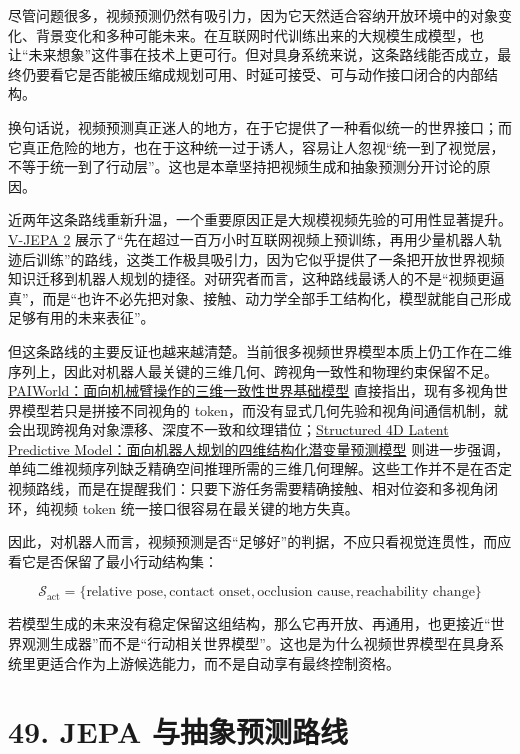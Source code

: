 尽管问题很多，视频预测仍然有吸引力，因为它天然适合容纳开放环境中的对象变化、背景变化和多种可能未来。在互联网时代训练出来的大规模生成模型，也让“未来想象”这件事在技术上更可行。但对具身系统来说，这条路线能否成立，最终仍要看它是否能被压缩成规划可用、时延可接受、可与动作接口闭合的内部结构。

换句话说，视频预测真正迷人的地方，在于它提供了一种看似统一的世界接口；而它真正危险的地方，也在于这种统一过于诱人，容易让人忽视“统一到了视觉层，不等于统一到了行动层”。这也是本章坚持把视频生成和抽象预测分开讨论的原因。

近两年这条路线重新升温，一个重要原因正是大规模视频先验的可用性显著提升。\href{https://arxiv.org/abs/2506.09985}{V-JEPA 2} 展示了“先在超过一百万小时互联网视频上预训练，再用少量机器人轨迹后训练”的路线，这类工作极具吸引力，因为它似乎提供了一条把开放世界视频知识迁移到机器人规划的捷径。对研究者而言，这种路线最诱人的不是“视频更逼真”，而是“也许不必先把对象、接触、动力学全部手工结构化，模型就能自己形成足够有用的未来表征”。

但这条路线的主要反证也越来越清楚。当前很多视频世界模型本质上仍工作在二维序列上，因此对机器人最关键的三维几何、跨视角一致性和物理约束保留不足。\href{https://arxiv.org/abs/2606.18375}{PAIWorld：面向机械臂操作的三维一致性世界基础模型} 直接指出，现有多视角世界模型若只是拼接不同视角的 token，而没有显式几何先验和视角间通信机制，就会出现跨视角对象漂移、深度不一致和纹理错位；\href{https://arxiv.org/abs/2607.01166}{Structured 4D Latent Predictive Model：面向机器人规划的四维结构化潜变量预测模型} 则进一步强调，单纯二维视频序列缺乏精确空间推理所需的三维几何理解。这些工作并不是在否定视频路线，而是在提醒我们：只要下游任务需要精确接触、相对位姿和多视角闭环，纯视频 token 统一接口很容易在最关键的地方失真。

因此，对机器人而言，视频预测是否“足够好”的判据，不应只看视觉连贯性，而应看它是否保留了最小行动结构集：

\begingroup
\scriptsize
\begin{equation*}
\mathcal{S}_{\text{act}} =
\{
\text{relative pose},
\text{contact onset},
\text{occlusion cause},
\text{reachability change}
\}
\end{equation*}
\endgroup

若模型生成的未来没有稳定保留这组结构，那么它再开放、再通用，也更接近“世界观测生成器”而不是“行动相关世界模型”。这也是为什么视频世界模型在具身系统里更适合作为上游候选能力，而不是自动享有最终控制资格。

\section*{49. JEPA 与抽象预测路线}

